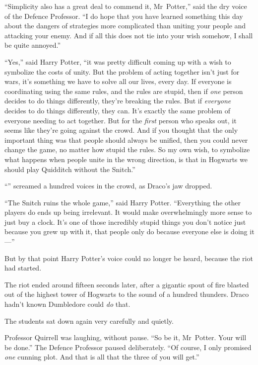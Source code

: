 “Simplicity also has a great deal to commend it, Mr~Potter,” said the dry voice of the Defence Professor. “I do hope that you have learned something this day about the dangers of strategies more complicated than uniting your people and attacking your enemy. And if all this does not tie into your wish somehow, I shall be quite annoyed.”

“Yes,” said Harry Potter, “it was pretty difficult coming up with a wish to symbolize the costs of unity. But the problem of acting together isn’t just for wars, it’s something we have to solve all our lives, every day. If everyone is coordinating using the same rules, and the rules are stupid, then if \emph{one} person decides to do things differently, they’re breaking the rules. But if \emph{everyone} decides to do things differently, they can. It’s exactly the same problem of everyone needing to act together. But for the \emph{first} person who speaks out, it seems like they’re going against the crowd. And if you thought that the only important thing was that people should always be unified, then you could never change the game, no matter how stupid the rules. So my own wish, to symbolize what happens when people unite in the wrong direction, is that in Hogwarts we should play Quidditch without the Snitch.”

“” screamed a hundred voices in the crowd, as Draco’s jaw dropped.

“The Snitch ruins the whole game,” said Harry Potter. “Everything the other players do ends up being irrelevant. It would make overwhelmingly more sense to just buy a clock. It’s one of those incredibly stupid things you don’t notice just because you grew up with it, that people only do because everyone else is doing it—”

But by that point Harry Potter’s voice could no longer be heard, because the riot had started.

\later

The riot ended around fifteen seconds later, after a gigantic spout of fire blasted out of the highest tower of Hogwarts to the sound of a hundred thunders. Draco hadn’t known Dumbledore could \emph{do} that.

The students sat down again very carefully and quietly.

Professor Quirrell was laughing, without pause. “So be it, Mr~Potter. Your will be done.” The Defence Professor paused deliberately. “Of course, I only promised \emph{one} cunning plot. And that is all that the three of you will get.”

